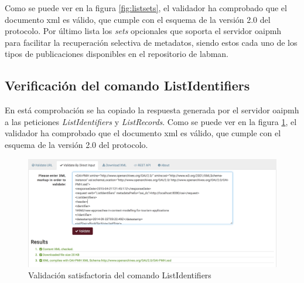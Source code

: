 Como se puede ver en la figura \ref{fig:listsets}, el validador ha comprobado que el documento \acrshort{xml} es válido, que cumple con el esquema de la versión 2.0 del protocolo. Por último lista los \textit{sets} opcionales que soporta el servidor \acrshort{oaipmh} para facilitar la recuperación selectiva de metadatos, siendo estos cada uno de los tipos de publicaciones disponibles en el repositorio de \acrshort{labman}.

\subsection{Verificación del comando ListIdentifiers}

En está comprobación se ha copiado la respuesta generada por el servidor \acrshort{oaipmh} a las peticiones \textit{ListIdentifiers} y \textit{ListRecords}. Como se puede ver en la figura \ref{fig:listidentifiers}, el validador ha comprobado que el documento \acrshort{xml} es válido, que cumple con el esquema de la versión 2.0 del protocolo.

\begin{figure}[!htbp]
	\centering
	\includegraphics[scale=0.32]{fig/oaipmh_validations/ListIdentifiers}
	\caption{Validación satisfactoria del comando ListIdentifiers}
	\label{fig:listidentifiers}
\end{figure}
